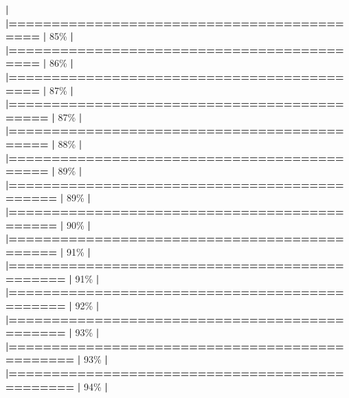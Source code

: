 \documentclass[
]{book}
\newenvironment{Shaded}{\begin{snugshade}}{\end{snugshade}}
\newcommand{\DecValTok}[1]{\textcolor[rgb]{0.00,0.00,0.81}{#1}}
\newcommand{\ErrorTok}[1]{\textcolor[rgb]{0.64,0.00,0.00}{\textbf{#1}}}
\newcommand{\NormalTok}[1]{#1}
\newcommand{\SpecialCharTok}[1]{\textcolor[rgb]{0.81,0.36,0.00}{\textbf{#1}}}
\begin{document}
\begin{Shaded}
\begin{Highlighting}[]
  \SpecialCharTok{|}                                                        
  \ErrorTok{|===========================================}       \ErrorTok{|}  \DecValTok{85}\NormalTok{\%}
  \SpecialCharTok{|}                                                        
  \ErrorTok{|===========================================}       \ErrorTok{|}  \DecValTok{86}\NormalTok{\%}
  \SpecialCharTok{|}                                                        
  \ErrorTok{|===========================================}       \ErrorTok{|}  \DecValTok{87}\NormalTok{\%}
  \SpecialCharTok{|}                                                        
  \ErrorTok{|============================================}      \ErrorTok{|}  \DecValTok{87}\NormalTok{\%}
  \SpecialCharTok{|}                                                        
  \ErrorTok{|============================================}      \ErrorTok{|}  \DecValTok{88}\NormalTok{\%}
  \SpecialCharTok{|}                                                        
  \ErrorTok{|============================================}      \ErrorTok{|}  \DecValTok{89}\NormalTok{\%}
  \SpecialCharTok{|}                                                        
  \ErrorTok{|=============================================}     \ErrorTok{|}  \DecValTok{89}\NormalTok{\%}
  \SpecialCharTok{|}                                                        
  \ErrorTok{|=============================================}     \ErrorTok{|}  \DecValTok{90}\NormalTok{\%}
  \SpecialCharTok{|}                                                        
  \ErrorTok{|=============================================}     \ErrorTok{|}  \DecValTok{91}\NormalTok{\%}
  \SpecialCharTok{|}                                                        
  \ErrorTok{|==============================================}    \ErrorTok{|}  \DecValTok{91}\NormalTok{\%}
  \SpecialCharTok{|}                                                        
  \ErrorTok{|==============================================}    \ErrorTok{|}  \DecValTok{92}\NormalTok{\%}
  \SpecialCharTok{|}                                                        
  \ErrorTok{|==============================================}    \ErrorTok{|}  \DecValTok{93}\NormalTok{\%}
  \SpecialCharTok{|}                                                        
  \ErrorTok{|===============================================}   \ErrorTok{|}  \DecValTok{93}\NormalTok{\%}
  \SpecialCharTok{|}                                                        
  \ErrorTok{|===============================================}   \ErrorTok{|}  \DecValTok{94}\NormalTok{\%}
  \SpecialCharTok{|}                                                        

\end{Highlighting}
\end{Shaded}
\end{document}
